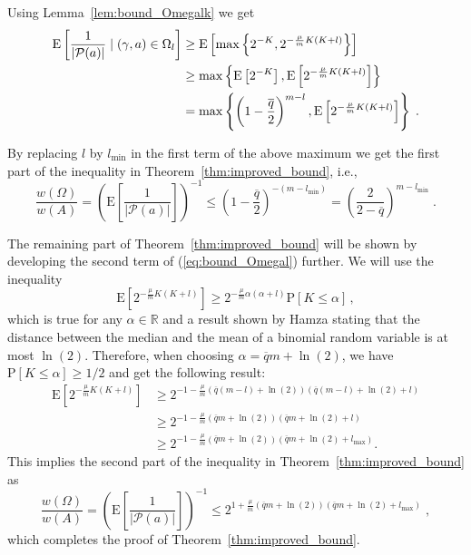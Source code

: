 \documentclass{article}
\newcommand\ex{\mathrm{E}}
\newcommand\prob{\mathrm{P}}
\begin{document}
Using Lemma~\ref{lem:bound_Omegalk} we get
\begin{align}
\ex\left[\frac{1}{|\mathcal{P}(a)|}\mid (\gamma,a)\in\Omega_l
\right]&\geq \ex\left[\max\left\{2^{-K},2^{-\frac{\mu}{m}K(K+l)}\right\}\right]
\notag \\
&\geq \max\left\{\ex\left[2^{-K}\right],\ex\left[2^{-\frac{\mu}{m}K(K+l)}\right]\right\}
\notag\\
&=\max\left\{\left(1-\frac{\overline{q}}{2}\right)^{m-l},\ex\left[2^{-\frac{\mu}{m}K(K+l)}\right]\right\}\;.\label{eq:bound_Omegal}
\end{align}

By replacing $l$ by $l_\mathrm{min}$ in the first term of the
above maximum we get the first part of the inequality in Theorem~\ref{thm:improved_bound}, i.e.,
\begin{equation*}
\frac{w(\Omega)}{w(A)}=\left(\ex\left[\frac{1}{|\mathcal{P}(a)|}\right]\right)^{-1}\leq \left(1-\frac{\overline{q}}{2}\right)^{-(m-l_\mathrm{min})}=\left(\frac{2}{2-\overline{q}}\right)^{m-l_\mathrm{min}}\;.
\end{equation*}

The remaining part of Theorem~\ref{thm:improved_bound} will be shown
by developing the second term of (\ref{eq:bound_Omegal}) further.
We will use the inequality
\begin{equation*}
\ex[2^{-\frac{\mu}{m}K(K+l)}]\geq
2^{-\frac{\mu}{m}\alpha(\alpha+l)} \prob[K\leq\alpha] \, ,
\end{equation*}
which is true for any $\alpha \in \mathbb{R}$ and a result shown by
Hamza \cite{hamza_1995_smallest} stating that the distance between
the median and the mean of a binomial random variable is at most
$\ln(2)$.
Therefore, when choosing
$\alpha=\overline{q}m+\ln(2)$, we have
$\prob[K\leq\alpha]\geq 1/2$ and get the following result:
\begin{align*}
\ex[2^{-\frac{\mu}{m}K(K+l)}]&\geq 2^{-1-\frac{\mu}{m}(\overline{q}(m-l)+\ln(2))(\overline{q}(m-l)+\ln(2)+l)}\\
&\geq 2^{-1-\frac{\mu}{m}(\overline{q}m+\ln(2))(\overline{q}m+\ln(2)+l)}\\
&\geq 2^{-1-\frac{\mu}{m}(\overline{q}m+\ln(2))(\overline{q}m+\ln(2)+l_\mathrm{max})} .
\end{align*}
This implies the second part of the inequality in
Theorem~\ref{thm:improved_bound} as
\begin{equation*}
\frac{w(\Omega)}{w(A)}=\left(\ex\left[\frac{1}{|\mathcal{P}(a)|}\right]\right)^{-1}\leq 2^{1+\frac{\mu}{m}(\overline{q}m+\ln(2))(\overline{q}m+\ln(2)+l_\mathrm{max})}\;,
\end{equation*}
which completes the proof of Theorem~\ref{thm:improved_bound}.
\end{document}
